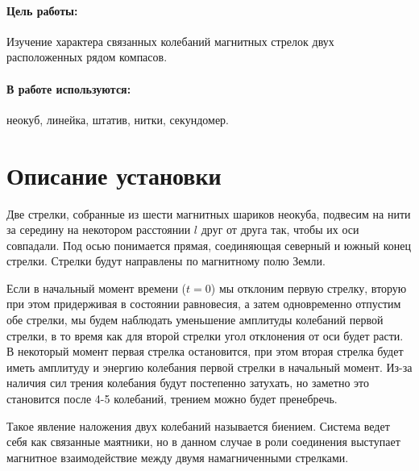 \documentclass{letask}
\begin{document}


\paragraph{Цель работы:} Изучение характера связанных колебаний магнитных стрелок двух расположенных рядом компасов.

\paragraph{В работе используются:} неокуб, линейка, штатив, нитки, секундомер.

\section{Описание установки}  

Две стрелки, собранные из шести магнитных шариков неокуба, подвесим на нити за середину на некотором расстоянии $l$ друг от друга так, чтобы их оси совпадали. Под осью понимается прямая, соединяющая северный и южный конец стрелки. Стрелки будут направлены по магнитному полю Земли.

Если в начальный момент времени ($t = 0$) мы отклоним первую стрелку, вторую при этом придерживая в состоянии равновесия, а затем одновременно отпустим обе стрелки, мы будем наблюдать уменьшение амплитуды колебаний первой стрелки, в то время как для второй стрелки угол отклонения от оси будет расти. В некоторый момент первая стрелка остановится, при этом вторая стрелка будет иметь амплитуду и энергию колебания первой стрелки в начальный момент. Из-за наличия сил трения колебания будут постепенно затухать, но заметно это становится после 4-5 колебаний, трением можно будет пренебречь.

Такое явление наложения двух колебаний называется биением. Система ведет себя как связанные маятники, но в данном случае в роли соединения выступает магнитное взаимодействие между двумя намагниченными стрелками.
 
\end{document}
